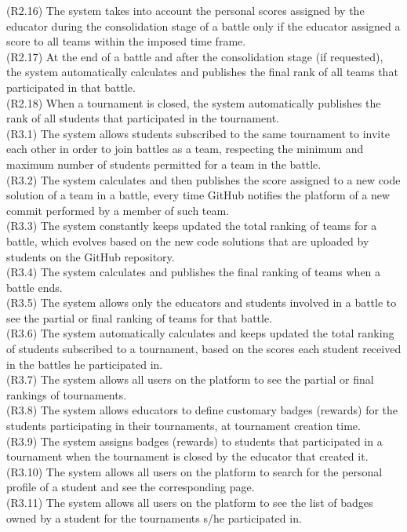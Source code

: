(R2.16) The system takes into account the personal scores assigned by the educator during the consolidation stage of a battle only if the educator assigned a score to all teams within the imposed time frame. \\
(R2.17) At the end of a battle and after the consolidation stage (if requested), the system automatically calculates and publishes the final rank of all teams that participated in that battle.  \\
(R2.18) When a tournament is closed, the system automatically publishes the rank of all students that participated in the tournament. \\
(R3.1) The system allows students subscribed to the same tournament to invite each other in order to join battles as a team, respecting the minimum and maximum number of students permitted for a team in the battle. \\
(R3.2) The system calculates and then publishes the score assigned to a new code solution of a team in a battle, every time GitHub notifies the platform of a new commit performed by a member of such team. \\
(R3.3) The system constantly keeps updated the total ranking of teams for a battle, which evolves based on the new code solutions that are uploaded by students on the GitHub repository. \\
(R3.4) The system calculates and publishes the final ranking of teams when a battle ends. \\
(R3.5) The system allows only the educators and students involved in a battle to see the partial or final ranking of teams for that battle. \\
(R3.6) The system automatically calculates and keeps updated the total ranking of students subscribed to a tournament, based on the scores each student received in the battles he participated in. \\
(R3.7) The system allows all users on the platform to see the partial or final rankings of tournaments. \\
(R3.8)  The system allows educators to define customary badges (rewards) for the students participating in their tournaments, at tournament creation time. \\
(R3.9) The system assigns badges (rewards) to students that participated in a tournament when the tournament is closed by the educator that created it. \\
(R3.10) The system allows all users on the platform to search for the personal profile of a student and see the corresponding page. \\
(R3.11) The system allows all users on the platform to see the list of badges owned by a student for the tournaments s/he participated in. \\